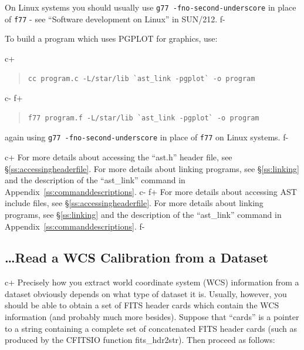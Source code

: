\documentclass[twoside,11pt]{article}
\newcommand{\xref}[3]{#1}
\newcommand{\appref}[1]{Appendix~\ref{#1}}
\newcommand{\secref}[1]{\S\ref{#1}}
\newcommand{\appref}[1]{\ref{#1}}
\newcommand{\secref}[1]{\ref{#1}}
\begin{document}
On Linux systems you should usually use \verb+g77 -fno-second-underscore+ in
place of \verb+f77+ - see \xref{``Software development on Linux''}{sun212}
{software_development_on_linux} in \xref{SUN/212}{sun212}{}.
f-

To build a program which uses PGPLOT for graphics, use:

c+
\begin{quote}
\small
\begin{verbatim}
cc program.c -L/star/lib `ast_link -pgplot` -o program
\end{verbatim}
\normalsize
\end{quote}
c-
f+
\begin{quote}
\small
\begin{verbatim}
f77 program.f -L/star/lib `ast_link -pgplot` -o program
\end{verbatim}
\normalsize
\end{quote}

again using \verb+g77 -fno-second-underscore+ in place of \verb+f77+
on Linux systems.
f-

c+
For more details about accessing the ``ast.h'' header file, see
\secref{ss:accessingheaderfile}. For more
details about linking programs, see \secref{ss:linking} and the
description of the ``ast\_link'' command in
\appref{ss:commanddescriptions}.
c-
f+
For more details about accessing AST include files, see
\secref{ss:accessingheaderfile}. For more
details about linking programs, see \secref{ss:linking} and the
description of the ``ast\_link'' command in
\appref{ss:commanddescriptions}.
f-

\subsection{\label{ss:howtoreadwcs}\ldots Read a WCS Calibration from a Dataset}

c+
Precisely how you extract world coordinate system (WCS) information
from a dataset obviously depends on what type of dataset it
is. Usually, however, you should be able to obtain a set of FITS
header cards which contain the WCS information (and probably much more
besides). Suppose that ``cards'' is a pointer to a string
containing a complete set of concatenated FITS header cards (such as
produced by the CFITSIO function fits\_hdr2str). Then proceed as follows:
\end{document}

